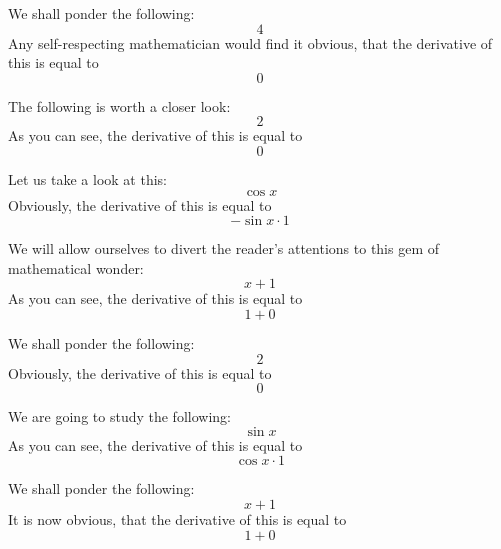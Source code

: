 \documentclass{article}
\begin{document}
We shall ponder the following:
\begin{equation}
4 
\end{equation}
Any self-respecting mathematician would find it obvious, that the derivative of this is equal to
\begin{equation}
0 
\end{equation}

The following is worth a closer look:
\begin{equation}
2 
\end{equation}
As you can see, the derivative of this is equal to
\begin{equation}
0 
\end{equation}

Let us take a look at this:
\begin{equation}
\cos x 
\end{equation}
Obviously, the derivative of this is equal to
\begin{equation}
-\sin x \cdot 1 
\end{equation}

We will allow ourselves to divert the reader's attentions to this gem of mathematical wonder:
\begin{equation}
x + 1 
\end{equation}
As you can see, the derivative of this is equal to
\begin{equation}
1 + 0 
\end{equation}

We shall ponder the following:
\begin{equation}
2 
\end{equation}
Obviously, the derivative of this is equal to
\begin{equation}
0 
\end{equation}

We are going to study the following:
\begin{equation}
\sin x 
\end{equation}
As you can see, the derivative of this is equal to
\begin{equation}
\cos x \cdot 1 
\end{equation}

We shall ponder the following:
\begin{equation}
x + 1 
\end{equation}
It is now obvious, that the derivative of this is equal to
\begin{equation}
1 + 0 
\end{equation}
\end{document}
